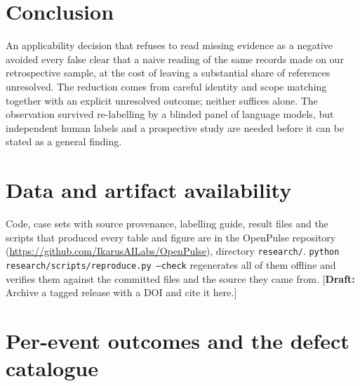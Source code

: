 \documentclass[11pt]{article}
\newcommand{\code}[1]{\texttt{#1}}
\newcommand{\draftnote}[1]{\textcolor{red!70!black}{[\textbf{Draft:} #1]}}
\begin{document}
\section{Conclusion}

An applicability decision that refuses to read missing evidence as a negative
avoided every false clear that a naive reading of the same records made on our
retrospective sample, at the cost of leaving a substantial share of
references unresolved. The reduction comes from careful identity and scope
matching together with an explicit unresolved outcome; neither suffices
alone. The observation survived re-labelling by a blinded panel of language
models, but independent human labels and a prospective study are needed
before it can be stated as a general finding.

\section*{Data and artifact availability}
\label{sec:availability}

Code, case sets with source provenance, labelling guide, result files and the
scripts that produced every table and figure are in the OpenPulse repository
(\url{https://github.com/IkarusAILabs/OpenPulse}), directory
\code{research/}. \code{python research/scripts/reproduce.py --check}
regenerates all of them offline and verifies them against the committed
files and the source they came from. \draftnote{Archive a tagged release with
a DOI and cite it here.}




\appendix
\section{Per-event outcomes and the defect catalogue}




\end{document}
